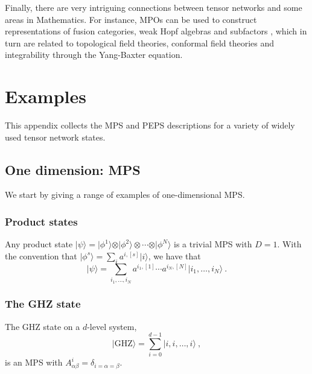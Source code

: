 \documentclass[rmp,aps,reprint,superscriptaddress,nobalancelastpage]{revtex4-1}
\newcommand{\ket}[1]{\vert#1\rangle}
\def\TOCstop{\addtocontents{toc}{\ignorethis}}
\begin{document}
Finally, there are very intriguing connections between tensor networks and some areas in Mathematics. For instance, MPOs can be used to construct representations of fusion categories, weak Hopf algebras and subfactors \cite{lootens2020matrix,kawahigashi2020remark,molnar:WHA}, which in turn are related to topological field theories, conformal field theories and integrability through the Yang-Baxter equation.
\appendix


\section{Examples%
  \label{app:examples}}

This appendix collects the MPS and PEPS descriptions for a variety of widely used tensor network states.

\subsection{One dimension: MPS}
\TOCstop


We start by giving a range of examples of one-dimensional MPS.

\subsubsection{Product states} Any product state $\ket{\psi}=\ket{\phi^1}\otimes\ket{\phi^2}\otimes\cdots\otimes\ket{\phi^N}$ is a trivial MPS with $D=1$. With the convention that $\ket{\phi^s}=\sum_i a^{i,[s]}\ket{i}$, we have that
\begin{equation}
    \ket\psi = \sum_{i_1,\dots,i_N} a^{i_1,[1]}\cdots a^{i_N,[N]}\ket{i_1,\dots,i_N}\ .
\end{equation}


\subsubsection{The GHZ state}


The GHZ state on  a $d$-level system,
\[
    \ket{\mathrm{GHZ}}=\sum_{i=0}^{d-1}\ket{i,i,\dots,i}\ ,
\]
is an MPS with $A^{i}_{\alpha\beta}=\delta_{i=\alpha=\beta}$.
\end{document}
